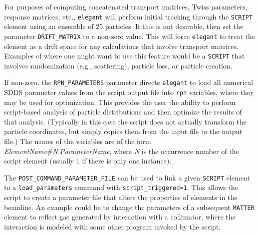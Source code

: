 For purposes of computing concatenated transport matrices, Twiss
parameters, response matrices, etc., {\tt elegant} will perform
initial tracking through the \verb|SCRIPT| element using an ensemble
of 25 particles.  If this is not desirable, then set the parameter
\verb|DRIFT_MATRIX| to a non-zero value.  This will force
\verb|elegant| to treat the element as a drift space for any
calculations that involve transport matrices.  Examples of where one
might want to use this feature would be a \verb|SCRIPT| that involves
randomization (e.g., scattering), particle loss, or particle creation.

If non-zero, the \verb|RPN_PARAMETERS| parameter directs \verb|elegant| to load all numerical
SDDS parameter values from the script output file into \verb|rpn| variables, where they may be used for
optimization. This provides the user the ability to perform script-based analysis of particle distributions and
then optimize the results of that analysis.
(Typically in this case the script does not actually transform the particle coordinates, but simply copies them
from the input file to the output file.)
The names of the variables are of the form {\em ElementName}\#{\em N}.{\em ParameterName}, where
{\em N} is the occurrence number of the script element (usually 1 if there is only one instance).

The \verb|POST_COMMAND_PARAMETER_FILE| can be used to link a given \verb|SCRIPT| element to a \verb|load_parameters|
command with \verb|script_triggered=1|. This allows the script to create a parameter file that alters the properties
of elements in the beamline. An example could be to change the parameters of a subsequent \verb|MATTER| element
to reflect gas generated by interaction with a collimator, where the interaction is modeled with some other
program invoked by the script.
